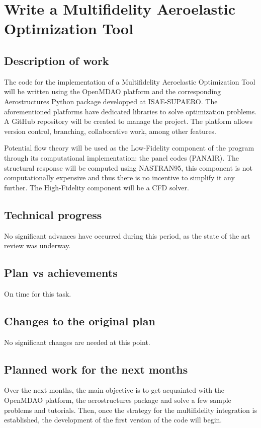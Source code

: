 \section{Write a Multifidelity Aeroelastic Optimization Tool}
\label{sec:task1}
\subsection{Description of work}
The code for the implementation of a Multifidelity Aeroelastic Optimization Tool will be written using the OpenMDAO platform and the corresponding Aerostructures Python package developped at ISAE-SUPAERO. The aforementioned platforms have dedicated libraries to solve optimization problems. A GitHub repository will be created to manage the project. The platform allows version control, branching, collaborative work, among other features. 

Potential flow theory will be used as the Low-Fidelity component of the program through its computational implementation: the panel codes (PANAIR). The structural response will be computed using NASTRAN95, this component is not computationally expensive and thus there is no incentive to simplify it any further. The High-Fidelity component will be a CFD solver. 
\subsection{Technical progress}
No significant advances have occurred during this period, as the state of the art review was underway. 
\subsection{Plan vs achievements}
On time for this task.
\subsection{Changes to the original plan}
No significant changes are needed at this point.
\subsection{Planned work for the next months}
Over the next months, the main objective is to get acquainted with the OpenMDAO platform, the aerostructures package and solve a few sample problems and tutorials. Then, once the strategy for the multifidelity integration is established, the development of the first version of the code will begin. 

